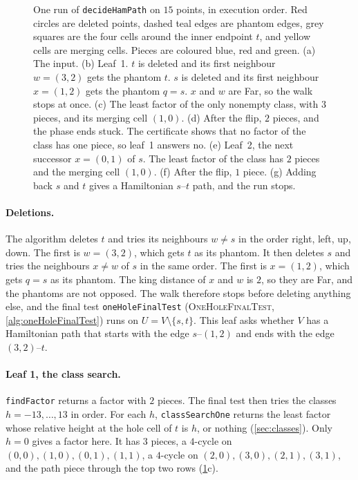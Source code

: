 \documentclass[11pt]{article}
\theoremstyle{plain}
\theoremstyle{definition}
\theoremstyle{remark}
\newcommand{\lean}[1]{\texttt{#1}}
\begin{document}
\begin{figure}[t]
\centering

\caption{One run of \lean{decideHamPath} on $15$ points, in execution order.
Red circles are deleted points, dashed teal edges are phantom edges, grey squares are the four
cells around the inner endpoint $t$, and yellow cells are merging cells.
Pieces are coloured blue, red and green.
(a) The input.
(b) Leaf~1.
$t$ is deleted and its first neighbour $w=(3,2)$ gets the phantom $t$.
$s$ is deleted and its first neighbour $x=(1,2)$ gets the phantom $q=s$.
$x$ and $w$ are Far, so the walk stops at once.
(c) The least factor of the only nonempty class, with $3$ pieces, and its merging cell $(1,0)$.
(d) After the flip, $2$ pieces, and the phase ends stuck.
The certificate shows that no factor of the class has one piece, so leaf~1 answers no.
(e) Leaf~2, the next successor $x=(0,1)$ of $s$.
The least factor of the class has $2$ pieces and the merging cell $(1,0)$.
(f) After the flip, $1$ piece.
(g) Adding back $s$ and $t$ gives a Hamiltonian $s$--$t$ path, and the run stops.}
\label{fig:example}
\end{figure}

\paragraph{Deletions.}
The algorithm deletes $t$ and tries its neighbours $w\ne s$ in the order right, left, up, down.
The first is $w=(3,2)$, which gets $t$ as its phantom.
It then deletes $s$ and tries the neighbours $x\ne w$ of $s$ in the same order.
The first is $x=(1,2)$, which gets $q=s$ as its phantom.
The king distance of $x$ and $w$ is $2$, so they are Far, and the phantoms are not opposed.
The walk therefore stops before deleting anything else, and the final test \lean{oneHoleFinalTest} (\textsc{OneHoleFinalTest}, \cref{alg:oneHoleFinalTest}) runs on
$U=V\setminus\{s,t\}$.
This leaf asks whether $V$ has a Hamiltonian path that starts with the edge $s$--$(1,2)$ and ends
with the edge $(3,2)$--$t$.

\paragraph{Leaf 1, the class search.}
\lean{findFactor} returns a factor with $2$ pieces.
The final test then tries the classes $h=-13,\dots,13$ in order.
For each $h$, \lean{classSearchOne} returns the least factor whose relative height at the hole cell of $t$ is
$h$, or nothing (\cref{sec:classes}).
Only $h=0$ gives a factor here.
It has $3$ pieces, a $4$-cycle on $(0,0),(1,0),(0,1),(1,1)$, a $4$-cycle on $(2,0),(3,0),(2,1),(3,1)$,
and the path piece through the top two rows (\cref{fig:example}c).
\end{document}
